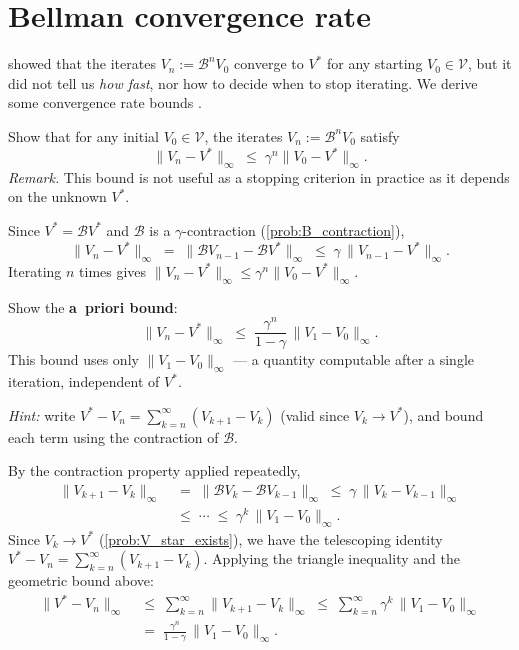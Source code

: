 \documentclass[11pt]{article}
\begin{document}


\section{Bellman convergence rate}\label{prob:convergence_rate}

 showed that the iterates $V_n := \mathcal{B}^n V_0$ converge to $V^*$ for any starting $V_0 \in \mathcal{V}$, but it did not tell us \emph{how fast}, nor how to decide when to stop iterating. We derive some convergence rate bounds \cite[Chapter~6]{putermanMarkovDecisionProcesses1994}.

\begin{exercise}
\label{prob:geometric_decay} Show that for any initial $V_0 \in \mathcal{V}$, the iterates $V_n := \mathcal{B}^n V_0$ satisfy
$$
\|V_n - V^*\|_\infty \;\le\; \gamma^n \|V_0 - V^*\|_\infty.
$$
\emph{Remark.} This bound is not useful as a stopping criterion in practice as it depends on the unknown $V^*$.
\end{exercise}

\begin{solution}
Since $V^* = \mathcal{B} V^*$ and $\mathcal{B}$ is a $\gamma$-contraction (\cref{prob:B_contraction}),
$$
\|V_n - V^*\|_\infty \;=\; \|\mathcal{B} V_{n-1} - \mathcal{B} V^*\|_\infty \;\le\; \gamma\, \|V_{n-1} - V^*\|_\infty.
$$
Iterating $n$ times gives $\|V_n - V^*\|_\infty \le \gamma^n \|V_0 - V^*\|_\infty$.
\end{solution}

\begin{exercise}
\label{prob:a_priori_bound} Show the \textbf{a~priori bound}:
$$
\|V_n - V^*\|_\infty \;\le\; \frac{\gamma^n}{1-\gamma}\, \|V_1 - V_0\|_\infty.
$$
This bound uses only $\|V_1 - V_0\|_\infty$ --- a quantity computable after a single iteration, independent of $V^*$.

\textit{Hint:} write $V^* - V_n = \sum_{k=n}^{\infty}(V_{k+1} - V_k)$ (valid since $V_k \to V^*$), and bound each term using the contraction of $\mathcal{B}$.
\end{exercise}

\begin{solution}
By the contraction property applied repeatedly,
\begin{align*}
\|V_{k+1} - V_k\|_\infty \;&=\; \|\mathcal{B} V_k - \mathcal{B} V_{k-1}\|_\infty \;\le\; \gamma\, \|V_k - V_{k-1}\|_\infty \\
&\le\; \cdots \;\le\; \gamma^k\, \|V_1 - V_0\|_\infty.
\end{align*}
Since $V_k \to V^*$ (\cref{prob:V_star_exists}), we have the telescoping identity $V^* - V_n = \sum_{k=n}^{\infty}(V_{k+1} - V_k)$. Applying the triangle inequality and the geometric bound above:
\begin{align*}
\|V^* - V_n\|_\infty \;&\le\; \sum_{k=n}^{\infty} \|V_{k+1} - V_k\|_\infty \;\le\; \sum_{k=n}^{\infty} \gamma^k\, \|V_1 - V_0\|_\infty \\
&=\; \frac{\gamma^n}{1-\gamma}\, \|V_1 - V_0\|_\infty.
\end{align*}
\end{solution}
\end{document}
